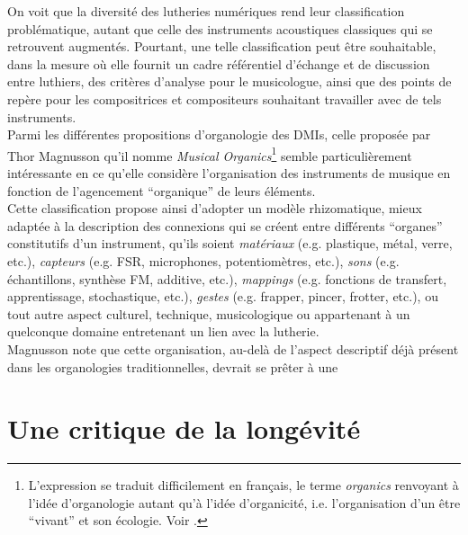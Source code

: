 \noindent On voit que la diversité des lutheries numériques rend leur classification problématique, autant que celle des instruments acoustiques classiques qui se retrouvent augmentés. Pourtant, une telle classification peut être souhaitable, dans la mesure où elle fournit un cadre référentiel d'échange et de discussion entre luthiers, des critères d'analyse pour le musicologue, ainsi que des points de repère pour les compositrices et compositeurs souhaitant travailler avec de tels instruments. \\
\indent Parmi les différentes propositions d'organologie des \glspl{DMI}, celle proposée par Thor Magnusson qu'il nomme \textit{Musical Organics}\footnote{L'expression se traduit difficilement en français, le terme \textit{organics} renvoyant à l'idée d'organologie autant qu'à l'idée d'organicité, i.e. l'organisation d'un être ``vivant'' et son écologie. Voir \cite{magnusson_musical_2017}.} semble particulièrement intéressante en ce qu'elle considère l'organisation des instruments de musique en fonction de l'agencement ``organique'' de leurs éléments.\\
\indent Cette classification propose ainsi d'adopter un modèle rhizomatique, mieux adaptée à la description des connexions qui se créent entre différents ``organes'' constitutifs d'un instrument, qu'ils soient \textit{matériaux} (e.g. plastique, métal, verre, etc.), \textit{capteurs} (e.g. \gls{FSR}, microphones, potentiomètres, etc.), \textit{sons} (e.g. échantillons, synthèse FM, additive, etc.), \textit{\glspl{mapping}} (e.g. fonctions de transfert, apprentissage, stochastique, etc.), \textit{gestes} (e.g. frapper, pincer, frotter, etc.), ou tout autre aspect culturel, technique, musicologique ou appartenant à un quelconque domaine entretenant un lien avec la lutherie.\\
\indent Magnusson note que cette organisation, au-delà de l'aspect descriptif déjà présent dans les organologies traditionnelles, devrait se prêter à une 

\section{Une critique de la longévité}
\label{sec:ephemerality:critique}

